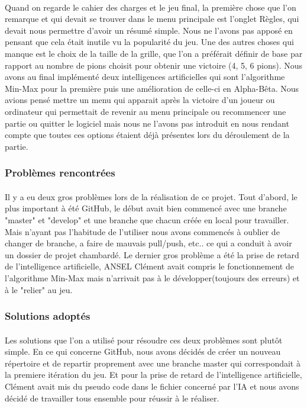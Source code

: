 \documentclass[a4paper,oneside]{article}
\begin{document}
\paragraph{}
Quand on regarde le cahier des charges et le jeu final, la première chose que l'on remarque et qui devait se trouver dans le menu principale est l'onglet Règles, qui devait nous permettre d'avoir un résumé simple.
Nous ne l'avons pas apposé en pensant que cela était inutile vu la popularité du jeu. Une des autres choses qui manque est le choix de la taille de la grille, que l'on a préférait définir de base par rapport au nombre de pions choisit pour obtenir une victoire (4, 5, 6 pions).
Nous avons au final implémenté deux intelligences artificielles qui sont l'algorithme Min-Max pour la première puis une amélioration de celle-ci en Alpha-Bêta.
Nous avions pensé mettre un menu qui apparait après la victoire d'un joueur ou ordinateur qui permettait de revenir au menu principale ou recommencer une partie ou quitter le logiciel mais nous ne l'avons pas introduit en nous rendant compte que toutes ces options étaient déjà présentes lors du déroulement de la partie.

\subsubsection{Problèmes rencontrées}
\paragraph{}
Il y a eu deux gros problèmes lors de la réalisation de ce projet.
Tout d'abord, le plus important à été GitHub, le début avait bien commencé avec une branche "master" et "develop" et une branche que chacun créée en local pour travailler.
Mais n'ayant pas l'habitude de l'utiliser nous avons commencés à oublier de changer de branche, a faire de mauvais pull/push, etc.. ce qui a conduit à avoir un dossier de projet chambardé.
Le dernier gros problème a été la prise de retard de l'intelligence artificielle, ANSEL Clément avait compris le fonctionnement de l'algorithme Min-Max mais n'arrivait pas à le développer(toujours des erreurs) et à le "relier" au jeu.

\subsubsection{Solutions adoptés}
\paragraph{}
Les solutions que l'on a utilisé pour résoudre ces deux problèmes sont plutôt simple.
En ce qui concerne GitHub, nous avons décidés de créer un nouveau répertoire et de repartir proprement avec une branche master qui correspondait à la premiere itération du jeu.
Et pour la prise de retard de l'intelligence artificielle, Clément avait mis du pseudo code dans le fichier concerné par l'IA et nous avons décidé de travailler tous ensemble pour réussir à le réaliser. 
\end{document}

